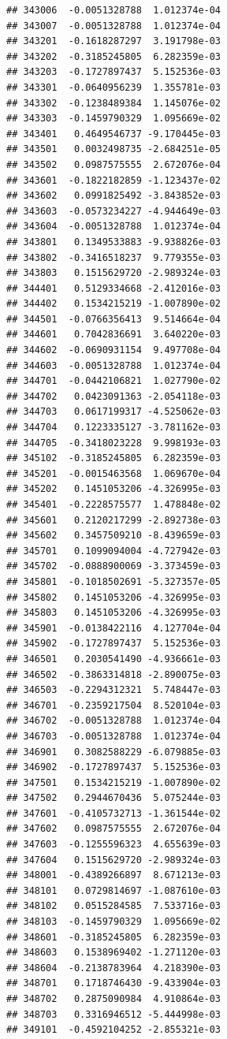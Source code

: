 \begin{frame}[fragile]
\begin{verbatim}
## 343006  -0.0051328788  1.012374e-04
## 343007  -0.0051328788  1.012374e-04
## 343201  -0.1618287297  3.191798e-03
## 343202  -0.3185245805  6.282359e-03
## 343203  -0.1727897437  5.152536e-03
## 343301  -0.0640956239  1.355781e-03
## 343302  -0.1238489384  1.145076e-02
## 343303  -0.1459790329  1.095669e-02
## 343401   0.4649546737 -9.170445e-03
## 343501   0.0032498735 -2.684251e-05
## 343502   0.0987575555  2.672076e-04
## 343601  -0.1822182859 -1.123437e-02
## 343602   0.0991825492 -3.843852e-03
## 343603  -0.0573234227 -4.944649e-03
## 343604  -0.0051328788  1.012374e-04
## 343801   0.1349533883 -9.938826e-03
## 343802  -0.3416518237  9.779355e-03
## 343803   0.1515629720 -2.989324e-03
## 344401   0.5129334668 -2.412016e-03
## 344402   0.1534215219 -1.007890e-02
## 344501  -0.0766356413  9.514664e-04
## 344601   0.7042836691  3.640220e-03
## 344602  -0.0690931154  9.497708e-04
## 344603  -0.0051328788  1.012374e-04
## 344701  -0.0442106821  1.027790e-02
## 344702   0.0423091363 -2.054118e-03
## 344703   0.0617199317 -4.525062e-03
## 344704   0.1223335127 -3.781162e-03
## 344705  -0.3418023228  9.998193e-03
## 345102  -0.3185245805  6.282359e-03
## 345201  -0.0015463568  1.069670e-04
## 345202   0.1451053206 -4.326995e-03
## 345401  -0.2228575577  1.478848e-02
## 345601   0.2120217299 -2.892738e-03
## 345602   0.3457509210 -8.439659e-03
## 345701   0.1099094004 -4.727942e-03
## 345702  -0.0888900069 -3.373459e-03
## 345801  -0.1018502691 -5.327357e-05
## 345802   0.1451053206 -4.326995e-03
## 345803   0.1451053206 -4.326995e-03
## 345901  -0.0138422116  4.127704e-04
## 345902  -0.1727897437  5.152536e-03
## 346501   0.2030541490 -4.936661e-03
## 346502  -0.3863314818 -2.890075e-03
## 346503  -0.2294312321  5.748447e-03
## 346701  -0.2359217504  8.520104e-03
## 346702  -0.0051328788  1.012374e-04
## 346703  -0.0051328788  1.012374e-04
## 346901   0.3082588229 -6.079885e-03
## 346902  -0.1727897437  5.152536e-03
## 347501   0.1534215219 -1.007890e-02
## 347502   0.2944670436  5.075244e-03
## 347601  -0.4105732713 -1.361544e-02
## 347602   0.0987575555  2.672076e-04
## 347603  -0.1255596323  4.655639e-03
## 347604   0.1515629720 -2.989324e-03
## 348001  -0.4389266897  8.671213e-03
## 348101   0.0729814697 -1.087610e-03
## 348102   0.0515284585  7.533716e-03
## 348103  -0.1459790329  1.095669e-02
## 348601  -0.3185245805  6.282359e-03
## 348603   0.1538969402 -1.271120e-03
## 348604  -0.2138783964  4.218390e-03
## 348701   0.1718746430 -9.433904e-03
## 348702   0.2875090984  4.910864e-03
## 348703   0.3316946512 -5.444998e-03
## 349101  -0.4592104252 -2.855321e-03

\end{verbatim}
\end{frame}
